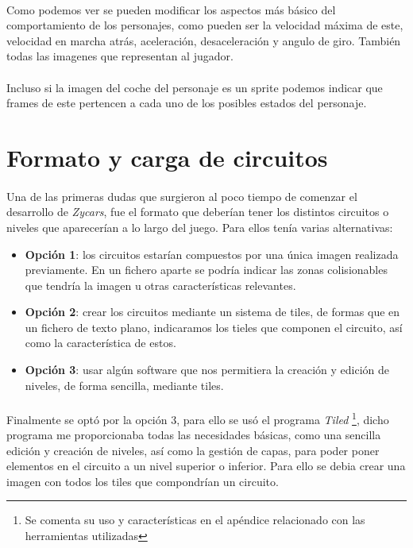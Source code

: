 \paragraph{}
Como podemos ver se pueden modificar los aspectos más básico del comportamiento de los personajes, como pueden ser la velocidad 
máxima de este, velocidad en marcha atrás, aceleración, desaceleración y angulo de giro. También todas las imagenes que representan
al jugador.

\paragraph{}
Incluso si la imagen del coche del personaje es un sprite podemos indicar que frames de este pertencen a cada uno de los posibles 
estados del personaje.

\section{Formato y carga de circuitos}

\paragraph{}
Una de las primeras dudas que surgieron al poco tiempo de comenzar el desarrollo de \emph{Zycars}, fue el formato que deberían
tener los distintos circuitos o niveles que aparecerían a lo largo del juego. Para ellos tenía varias alternativas:

\begin{itemize}
    \item \textbf{Opción 1}: los circuitos estarían compuestos por una única imagen realizada previamente. En un fichero aparte se 
    podría indicar las zonas colisionables que tendría la imagen u otras características relevantes.
    
    \item \textbf{Opción 2}: crear los circuitos mediante un sistema de tiles, de formas que en un fichero de texto plano, indicaramos 
    los tieles que componen el circuito, así como la característica de estos.
    
    \item \textbf{Opción 3}: usar algún software que nos permitiera la creación y edición de niveles, de forma sencilla, mediante tiles.
\end{itemize}

\paragraph{}
Finalmente se optó por la opción 3, para ello se usó el programa \emph{Tiled} \footnote{Se comenta su uso y características en el
apéndice relacionado con las herramientas utilizadas}, dicho programa me proporcionaba todas las necesidades básicas, como una 
sencilla edición y creación de niveles, así como la gestión de capas, para poder poner elementos en el circuito a un nivel 
superior o inferior. Para ello se debia crear una imagen con todos los tiles que compondrían un circuito.

